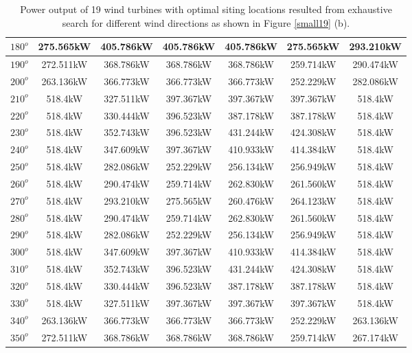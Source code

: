\begin{table}[H]
\begin{tabular}{|c|c|c|c|c|c|c|}
		$180^o$	& 275.565kW	& 405.786kW	& 405.786kW	& 405.786kW	& 275.565kW	& 293.210kW	\\ \hline
		$190^o$	& 272.511kW	& 368.786kW	& 368.786kW	& 368.786kW	& 259.714kW	& 290.474kW	\\ \hline
		$200^o$	& 263.136kW	& 366.773kW	& 366.773kW	& 366.773kW	& 252.229kW	& 282.086kW	\\ \hline
		$210^o$	& 518.4kW	& 327.511kW	& 397.367kW	& 397.367kW	& 397.367kW	& 518.4kW	\\ \hline
		$220^o$	& 518.4kW	& 330.444kW	& 396.523kW	& 387.178kW	& 387.178kW	& 518.4kW	\\ \hline
		$230^o$	& 518.4kW	& 352.743kW	& 396.523kW	& 431.244kW	& 424.308kW	& 518.4kW	\\ \hline
		$240^o$	& 518.4kW	& 347.609kW	& 397.367kW	& 410.933kW	& 414.384kW	& 518.4kW	\\ \hline
		$250^o$	& 518.4kW	& 282.086kW	& 252.229kW	& 256.134kW	& 256.949kW	& 518.4kW	\\ \hline
		$260^o$	& 518.4kW	& 290.474kW	& 259.714kW	& 262.830kW	& 261.560kW	& 518.4kW	\\ \hline
		$270^o$	& 518.4kW	& 293.210kW	& 275.565kW	& 260.476kW	& 264.123kW	& 518.4kW	\\ \hline
		$280^o$	& 518.4kW	& 290.474kW	& 259.714kW	& 262.830kW	& 261.560kW	& 518.4kW	\\ \hline
		$290^o$	& 518.4kW	& 282.086kW	& 252.229kW	& 256.134kW	& 256.949kW	& 518.4kW	\\ \hline
		$300^o$	& 518.4kW	& 347.609kW	& 397.367kW	& 410.933kW	& 414.384kW	& 518.4kW	\\ \hline
		$310^o$	& 518.4kW	& 352.743kW	& 396.523kW	& 431.244kW	& 424.308kW	& 518.4kW	\\ \hline
		$320^o$	& 518.4kW	& 330.444kW	& 396.523kW	& 387.178kW	& 387.178kW	& 518.4kW	\\ \hline
		$330^o$	& 518.4kW	& 327.511kW	& 397.367kW	& 397.367kW	& 397.367kW	& 518.4kW	\\ \hline
		$340^o$	& 263.136kW	& 366.773kW	& 366.773kW	& 366.773kW	& 252.229kW	& 263.136kW	\\ \hline
		$350^o$	& 272.511kW	& 368.786kW	& 368.786kW	& 368.786kW	& 259.714kW	& 267.174kW	\\ \hline
        	\end{tabular}
        	\caption{Power output of 19 wind turbines with optimal siting locations resulted from exhaustive search for different wind directions as shown in Figure \ref{small19} (b).}
        	\label{table19b}
        \end{table}
